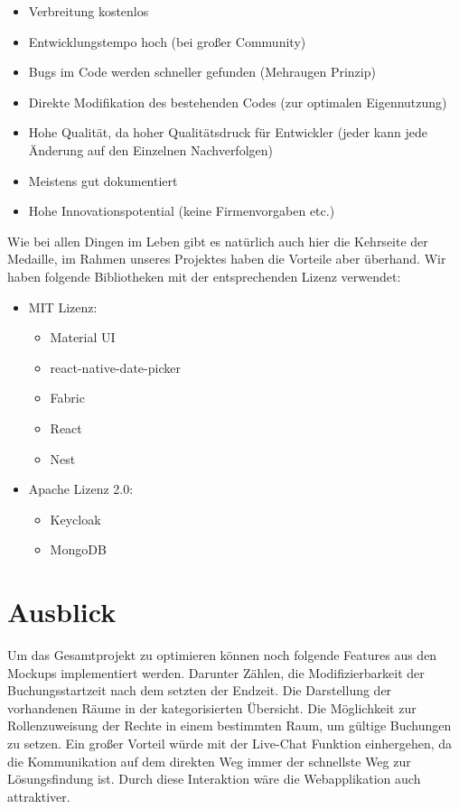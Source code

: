 \begin{itemize}
    \item	Verbreitung kostenlos
    \item   Entwicklungstempo hoch (bei großer Community)
    \item   Bugs im Code werden schneller gefunden (Mehraugen Prinzip)
    \item	Direkte Modifikation des bestehenden Codes (zur optimalen Eigennutzung)
    \item	Hohe Qualität, da hoher Qualitätsdruck für Entwickler (jeder kann jede Änderung auf den Einzelnen Nachverfolgen)
    \item	Meistens gut dokumentiert
    \item	Hohe Innovationspotential (keine Firmenvorgaben etc.)
\end{itemize}

Wie bei allen Dingen im Leben gibt es natürlich auch hier die Kehrseite der Medaille, im Rahmen unseres Projektes haben die Vorteile aber überhand. 
Wir haben folgende Bibliotheken mit der entsprechenden Lizenz verwendet:

\begin{itemize}
\item	MIT Lizenz:
\begin{itemize}
    \item	Material UI
    \item	react-native-date-picker
    \item	Fabric
    \item	React
    \item	Nest
\end{itemize}
\end{itemize}
\begin{itemize}
    \item	Apache Lizenz 2.0:
    \begin{itemize}
\item	Keycloak
\item	MongoDB
\end{itemize}
\end{itemize}


\section{Ausblick}
Um das Gesamtprojekt zu optimieren können noch folgende Features aus den Mockups implementiert werden.
Darunter Zählen, die Modifizierbarkeit der Buchungsstartzeit nach dem setzten der Endzeit. 
Die Darstellung der vorhandenen Räume in der kategorisierten Übersicht. 
Die Möglichkeit zur Rollenzuweisung der Rechte in einem bestimmten Raum, um gültige Buchungen zu setzen. 
Ein großer Vorteil würde mit der Live-Chat Funktion einhergehen, 
da die Kommunikation auf dem direkten Weg immer der schnellste Weg zur Lösungsfindung ist. 
Durch diese Interaktion wäre die Webapplikation auch attraktiver.